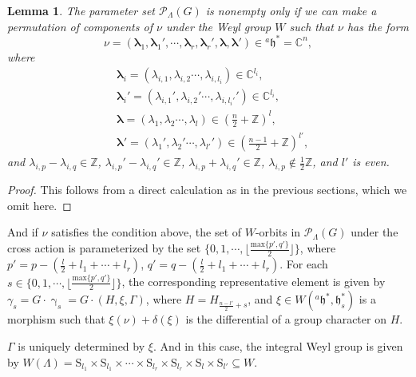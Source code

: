 \documentclass[12pt, a4paper]{amsart}
\numberwithin{equation}{section}
\newtheorem{lem}[thm]{Lemma}
\newcommand{\blam}{{\boldsymbol{\lambda}}}
\newcommand{\BC}{{\mathbb {C}}}
\newcommand{\BZ}{{\mathbb {Z}}}
\newcommand{\CP}{{\mathcal {P}}}
\newcommand{\fh}{\mathfrak{h}}
\begin{document}
\begin{lem}
    The parameter set $\mathscr{P}_{\Lambda}(G)$ is nonempty only if we can make a permutation of components of $\nu$ under the Weyl group $W$ such that $\nu$ has the form
\begin{equation}
    \nu = (\blam_1, \blam_1', \cdots, \blam_r, \blam_r', \blam,\blam') \in {^{a}\fh}^* = \BC^n,
\end{equation}
where 
\begin{align}
    &\blam_i = (\lambda_{i,1}, \lambda_{i,2} \cdots , \lambda_{i,l_i} ) \in \BC^{l_i},\\
    &\blam_i' = (\lambda_{i,1}', \lambda_{i,2}' \cdots , \lambda_{i,l_i'}' ) \in \BC^{l_i},\\
    &\blam = (\lambda_{1}, \lambda_{2} \cdots , \lambda_{l} ) \in (\frac{n}{2}+ \BZ)^{l},\\
    &\blam' = (\lambda_{1}', \lambda_{2}' \cdots , \lambda_{l'}' ) \in (\frac{n-1}{2}+ \BZ)^{l'},
\end{align}
and $\lambda_{i,p} - \lambda_{i,q} \in \BZ$, $\lambda_{i,p}' - \lambda_{i,q}' \in \BZ$, $\lambda_{i,p} + \lambda_{i,q}' \in \BZ$, $\lambda_{i,p} \notin \frac{1}{2}\BZ$, and $l'$ is even. 
\end{lem}

\begin{proof}
    This follows from a direct calculation as in the previous sections, which we omit here.
\end{proof}




And if $\nu$ satisfies the condition above, the set of $W$-orbits in $\CP_{\Lambda}(G)$ under the cross action is parameterized by the set $\{0,1,\cdots,\lfloor \frac{\mathrm{max}\{p',q'\}}{2} \rfloor\}$, where $p' = p- (\frac{l}{2} + l_1 + \cdots + l_r )$, $q' = q - (\frac{l}{2} + l_1 + \cdots + l_r)$. For each $s \in \{0,1,\cdots,\lfloor \frac{\mathrm{max}\{p',q'\}}{2} \rfloor\}$, the corresponding representative element is given by $\gamma_s =G \cdot \upgamma_s = G \cdot (H, \xi, \Gamma)$, where $H = H_{\frac{n-l'}{2} + s}$, and $\xi \in W({^{a}\fh^*},\fh_s^*)$ is a morphism such that $\xi(\nu) + \delta(\xi)$ is the differential of a group character on $H$.


$\Gamma$ is uniquely determined by $\xi$. And in this case, the integral Weyl group is given by $W(\Lambda) =  \mathrm{S}_{l_1} \times \mathrm{S}_{l_1} \times \cdots \times \mathrm{S}_{l_r} \times \mathrm{S}_{l_r} \times \mathrm{S}_{l} \times \mathrm{S}_{l'} \subseteq W$.
\end{document}
